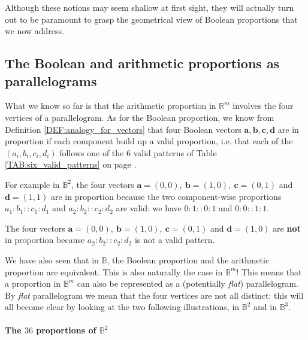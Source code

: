 Although these notions may seem shallow at first sight, they will actually turn
out to be paramount to grasp the geometrical view of Boolean proportions that
we now address.

\subsection{The Boolean and arithmetic proportions as parallelograms}

What we know so far is that the arithmetic proportion in $\mathbb{R}^m$
involves the four vertices of a parallelogram. As for the Boolean proportion,
we know from Definition \ref{DEF:analogy_for_vectors} that four Boolean vectors
$\mathbf{a}, \mathbf{b}, \mathbf{c}, \mathbf{d}$ are in proportion if each
component build up a valid proportion, i.e. that each of the $(a_i, b_i, c_i,
d_i)$ follows one of the $6$ valid patterns of Table
\ref{TAB:six_valid_patterns} on page \pageref{TAB:six_valid_patterns}.
\begin{testexample}
For example in $\mathbb{B}^2$, the four vectors $\mathbf{a} = (0, 0),~
  \mathbf{b} = (1, 0),~ \mathbf{c} = (0, 1)$ and $\mathbf{d} = (1, 1)$ are in
  proportion because the two component-wise proportions $a_1 : b_1 :: c_1 :
  d_1$ and $a_2 : b_2 :: c_2:d_2$ are valid: we have $0: 1 :: 0: 1$ and
  $0:0::1:1$.

  The four vectors $\mathbf{a} = (0, 0),~ \mathbf{b} = (1, 0),~ \mathbf{c} =
  (0, 1)$ and $\mathbf{d} = (1, 0)$ are \textbf{not} in proportion because $a_2
  : b_2 :: c_2 : d_2$ is not a valid pattern.
\end{testexample}

We have also seen that in $\mathbb{B}$, the Boolean
proportion and the arithmetic proportion are equivalent. This is also naturally
the case in $\mathbb{B}^m$! This means that a proportion in $\mathbb{B}^m$ can
also be represented as a (potentially \textit{flat}) parallelogram. By
\textit{flat} parallelogram we mean that the four vertices are not all
distinct: this will all become clear by looking at the two following
illustrations, in $\mathbb{B}^2$ and in $\mathbb{B}^3$.

\paragraph{The $36$ proportions of $\mathbb{B}^2$\\}

